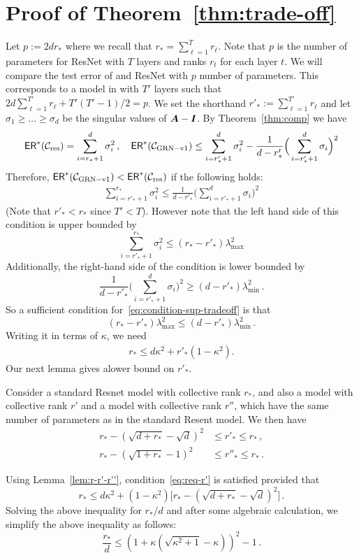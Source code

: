 \section{Proof of Theorem~\ref{thm:trade-off}}
Let $p:= 2dr_*$ where we recall that $r_* = \sum_{\ell=1}^T r_\ell$. Note that $p$ is the number of parameters for ResNet with $T$ layers and ranks $r_t$ for each layer $t$. We will compare the test error of \GenA{} and  ResNet with $p$ number of parameters. This corresponds to a model in \GenA{} with $T'$ layers such that $2d\sum_{\ell=1}^{T'} r_\ell+T'(T'-1)/2 = p$. We set the shorthand $r'_*:=\sum_{\ell=1}^{T'}r_\ell$ and let $\sigma_1\ge \dotsc\ge \sigma_{d}$ be the singular values of ${\bm{A}}-\bm{I}$. By Theorem~\ref{thm:comp} we have
\[
{\sf ER}^*(\mathcal{C}_{\rm res}) = \sum_{i=r_*+1}^d \sigma_i^2\,,\quad 
{\sf ER}^*(\mathcal{C}_{\rm GRN-v1{}}) \le \sum_{i=r'_*+1}^d \sigma_i^2 - \frac{1}{d-r'_*} \Big(\sum_{i=r'_*+1}^d \sigma_i \Big)^2
\]
Therefore, ${\sf ER}^*(\mathcal{C}_{\rm GRN-v1{}}) < {\sf ER}^*(\mathcal{C}_{\rm res})$ if the following holds:
\begin{align}\label{eq:condition-sup-tradeoff}
\sum_{i=r'_*+1}^{r_*} \sigma_i^2
\le \frac{1}{d-r'_*} \Big(\sum_{i=r'_*+1}^d \sigma_i \Big)^2
\end{align}
(Note that $r'_*< r_*$ since $T'<T$). However note that the left hand side of this condition is upper bounded by
\[
\sum_{i=r'_*+1}^{r_*} \sigma_i^2 \le (r_*-r'_*) \lambda_{\max}^2 
\]
Additionally, the right-hand side of the condition is lower bounded by 
\[
\frac{1}{d-r'_*} \Big(\sum_{i=r'_*+1}^d \sigma_i \Big)^2 \ge (d-r'_*)\lambda_{\min}^2\,.
\]
So a sufficient condition for~\eqref{eq:condition-sup-tradeoff} is that 
\[
(r_*- r'_*) \lambda_{\max}^2\le (d-r'_*)\lambda_{\min}^2\,.
\]
Writing it in terms of $\kappa$, we need 
\begin{align}\label{eq:req-r'}
r_*\le d\kappa^2+r'_*(1-\kappa^2).
\end{align}
Our next lemma gives alower bound on $r'_*$.
\begin{lemma}\label{lem:r-r'-r''}
Consider a standard Resnet model with collective rank $r_*$, and also a \GenA{} model with collective rank $r'$ and a \GenB{} model with collective rank $r''$, which have the same number of parameters as in the standard Resent model. We then have
\begin{align}
    r_* - (\sqrt{d+r_*}-\sqrt{d})^2 &\le r'_*\le r_*\,,\\
    r_* - (\sqrt{1+r_*}-1)^2 &\le r''_*\le r_*\,.
\end{align}
\end{lemma}
Using Lemma~\ref{lem:r-r'-r''}, condition~\ref{eq:req-r'} is satisfied provided that
\[
r_*\le d\kappa^2 + (1-\kappa^2) \Big[r_* - (\sqrt{d+r_*} - \sqrt{d})^2 \Big]\,.
\]
Solving the above inequality for $r_*/d$ and after some algebraic calculation, we simplify the above inequality as follows:
\[
\frac{r_*}{d} \le (1+\kappa(\sqrt{\kappa^2+1}-\kappa))^2 - 1\,.
\]

